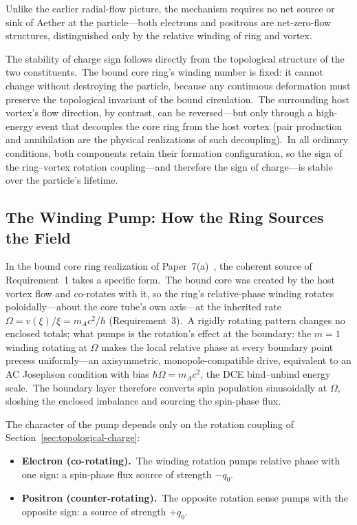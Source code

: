 ﻿\documentclass[12pt,letterpaper]{article}
\begin{document}
Unlike the earlier radial-flow picture, the mechanism requires no net source or sink
of Aether at the particle---both electrons and positrons are net-zero-flow structures,
distinguished only by the relative winding of ring and vortex.

The stability of charge sign follows directly from the topological structure of the
two constituents.\ The bound core ring's winding number is fixed: it cannot change
without destroying the particle, because any continuous deformation must preserve the
topological invariant of the bound circulation.\ The surrounding host vortex's flow
direction, by contrast, can be reversed---but only through a high-energy event that
decouples the core ring from the host vortex (pair production and annihilation are
the physical realizations of such decoupling).\ In all ordinary conditions, both
components retain their formation configuration, so the sign of the ring--vortex
rotation coupling---and therefore the sign of charge---is stable over the particle's
lifetime.


\subsection{The Winding Pump: How the Ring Sources the Field}
\label{sec:piston-radiation}

In the bound core ring realization of Paper~7(a)~\cite{otto-boundcore}, the
coherent source of Requirement~1 takes a specific form.\ The bound core was
created by the host vortex flow and co-rotates with it, so the ring's
relative-phase winding rotates poloidally---about the core tube's own
axis---at the inherited rate $\Omega = v(\xi)/\xi = m_A c^2/\hbar$
(Requirement~3).\ A rigidly rotating pattern changes no enclosed totals; what
pumps is the rotation's effect at the boundary: the $m = 1$ winding rotating
at $\Omega$ makes the local relative phase at every boundary point precess
uniformly---an axisymmetric, monopole-compatible drive, equivalent to an AC
Josephson condition with bias $\hbar\Omega = m_A c^2$, the DCE bind--unbind
energy scale.\ The boundary layer therefore converts spin population
sinusoidally at $\Omega$, sloshing the enclosed imbalance and sourcing the
spin-phase flux.

The character of the pump depends only on the rotation coupling of
Section~\ref{sec:topological-charge}:

\begin{itemize}[leftmargin=2em]
  \item \textbf{Electron (co-rotating).}\ The winding rotation pumps
    relative phase with one sign: a spin-phase flux source of strength
    $-q_0$.
  \item \textbf{Positron (counter-rotating).}\ The opposite rotation sense
    pumps with the opposite sign: a source of strength $+q_0$.
\end{itemize}
\end{document}
